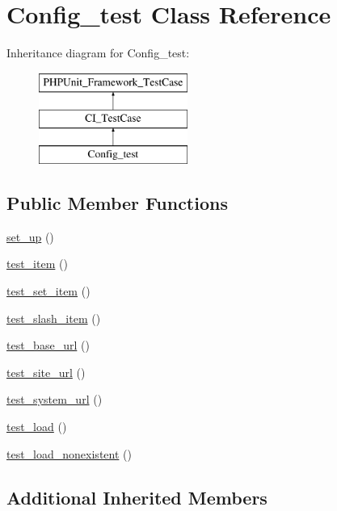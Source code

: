 \hypertarget{class_config__test}{}\section{Config\+\_\+test Class Reference}
\label{class_config__test}
Inheritance diagram for Config\+\_\+test\+:\begin{figure}[H]
\begin{center}
\leavevmode
\includegraphics[height=3.000000cm]{class_config__test}
\end{center}
\end{figure}
\subsection*{Public Member Functions}
\begin{DoxyCompactItemize}
\item 
\hyperlink{class_config__test_a69829875c8d4b6ce94908445c4155741}{set\+\_\+up} ()
\item 
\hyperlink{class_config__test_a14bb4f772ea3a814238b7fdb94d4987a}{test\+\_\+item} ()
\item 
\hyperlink{class_config__test_a9ac6fc7b17e17237ad7ffa0d0f3cb398}{test\+\_\+set\+\_\+item} ()
\item 
\hyperlink{class_config__test_ad1b650ea26683e630cf9638e0c1e7e47}{test\+\_\+slash\+\_\+item} ()
\item 
\hyperlink{class_config__test_a7057c796098bec2e9a20c3b57cf6c605}{test\+\_\+base\+\_\+url} ()
\item 
\hyperlink{class_config__test_a754c636b9c2ab5a22c9494b0661d29d2}{test\+\_\+site\+\_\+url} ()
\item 
\hyperlink{class_config__test_a3072c3cf2265c77e3bf75b29e226205b}{test\+\_\+system\+\_\+url} ()
\item 
\hyperlink{class_config__test_ae8db85d194058ce3ae0a8544d9f6cb85}{test\+\_\+load} ()
\item 
\hyperlink{class_config__test_aa6cefa53d9d0f73e7b5219a7149152ea}{test\+\_\+load\+\_\+nonexistent} ()
\end{DoxyCompactItemize}
\subsection*{Additional Inherited Members}


